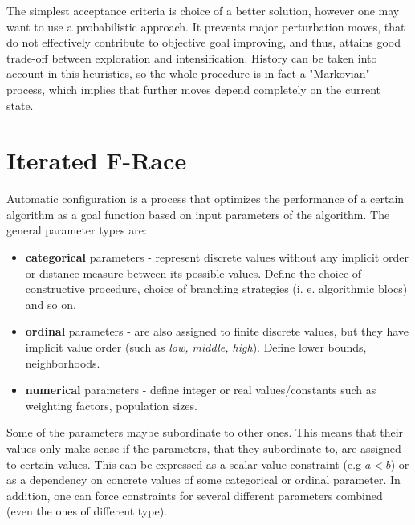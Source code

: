 \documentclass[11pt,a4paper,oneside]{book}
\begin{document}
The simplest acceptance criteria is choice of a better solution, however one may want to use a probabilistic approach. It prevents   major perturbation moves, that do not effectively contribute to objective goal improving, and thus, attains good trade-off between exploration and intensification. History can be taken into account in this heuristics, so the whole procedure is in fact a "Markovian" process, which implies that further moves depend completely on the current state.

\section{Iterated F-Race}

Automatic configuration is a process that optimizes the performance of a certain algorithm as a goal function based on input parameters of the algorithm. The general parameter types are:
 
\begin{itemize}
\item \textbf{categorical} parameters - represent discrete values without any implicit order or distance measure between its possible values. Define the choice of constructive procedure, choice of branching strategies (i. e. algorithmic blocs) and so on.
\item \textbf{ordinal} parameters - are also assigned to finite discrete values, but they have implicit value order (such as \emph{low, middle, high}). Define lower bounds, neighborhoods.
\item \textbf{numerical} parameters - define integer or real values/constants such as weighting factors, population sizes.
\end{itemize}

Some of the parameters maybe subordinate to other ones. This means that their values only make sense if the parameters, that they subordinate to, are assigned to certain values. This can be expressed as a scalar value constraint (e.g $a < b$) or as a dependency on concrete values of some categorical or ordinal parameter. In addition, one can force constraints for several different parameters combined (even the ones of different type).
\end{document}
